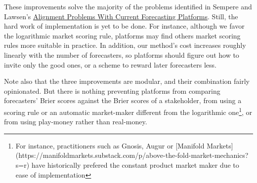\documentclass[]{article}
\begin{document}
These improvements solve the majority of the problems identified in
Sempere and Lawsen's \href{https://arxiv.org/abs/2106.11248}{Alignment
Problems With Current Forecasting Platforms}. Still, the hard work of
implementation is yet to be done. For instance, although we favor the
logarithmic market scoring rule, platforms may find others market
scoring rules more suitable in practice. In addition, our method's cost
increases roughly linearly with the number of forecasters, so platforms
should figure out how to invite only the good ones, or a scheme to
reward later forecasters less.

Note also that the three improvements are modular, and their combination
fairly opinionated. But there is nothing preventing platforms from
comparing forecasters' Brier scores against the Brier scores of a
stakeholder, from using a scoring rule or an automatic market-maker
different from the logarithmic
one\footnote{For instance, practitioners such as Gnosis, Augur or [Manifold Markets](https://manifoldmarkets.substack.com/p/above-the-fold-market-mechanics?s=r) have historically prefered the constant product market maker due to ease of implementation},
or from using play-money rather than real-money.
\end{document}
